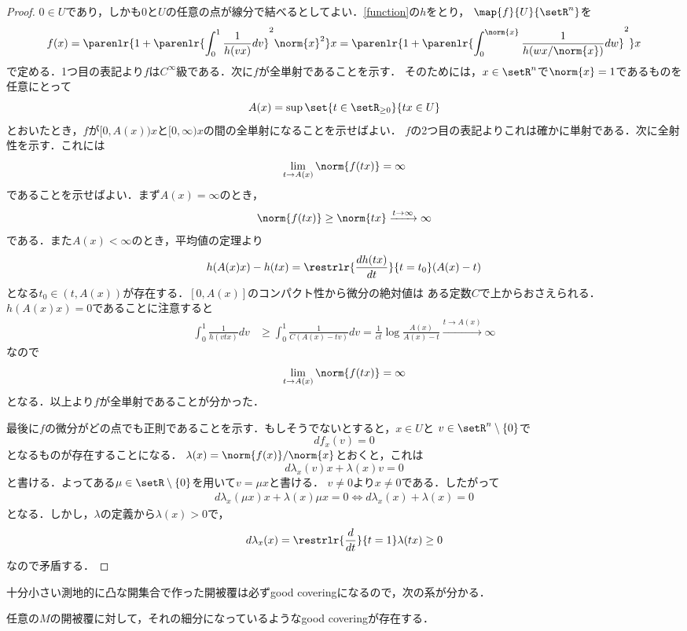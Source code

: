 \documentclass[uplatex]{jsarticle}
\begin{document}
\begin{proof}
  $0\in U$であり，しかも0と$U$の任意の点が線分で結べるとしてよい．\cref{function}の$h$をとり，
  $\map{f}{U}{\setR^n}$を
    \[f(x)=\parenlr{1+\parenlr{\int_0^1 \frac{1}{h(vx)}dv}^2\norm{x}^2}x
    =\parenlr{1+\parenlr{\int_0^{\norm{x}}\frac{1}{h(wx/\norm{x})}dw }^2 }x \]
  で定める．1つ目の表記より$f$は$C^\infty$級である．次に$f$が全単射であることを示す．
  そのためには，$x\in \setR^n$で$\norm{x}=1$であるものを任意にとって
    \[A(x)=\sup\set{t\in \setR_{\geq0}}{tx\in U}\]
  とおいたとき，$f$が$[0, A(x))x$と$[0,\infty)x$の間の全単射になることを示せばよい．
  $f$の2つ目の表記よりこれは確かに単射である．次に全射性を示す．これには
    \[\lim_{t\to A(x)} \norm{f(tx)} = \infty \]
  であることを示せばよい．まず$A(x)=\infty$のとき，
    \[\norm{f(tx)} \geq \norm{tx} \xrightarrow{t\to \infty} \infty \]
  である．また$A(x)< \infty$のとき，平均値の定理より
    \[h(A(x)x)-h(tx)=\restrlr{\frac{dh(tx)}{dt}}{t=t_0} (A(x)-t) \]
  となる$t_0\in (t, A(x))$が存在する．$[0,A(x)]$のコンパクト性から微分の絶対値は
  ある定数$C$で上からおさえられる．$h(A(x)x)=0$であることに注意すると
  \begin{align*}
    \int_0^1 \frac{1}{h(vtx)}dv&\geq \int_0^1 \frac{1}{C(A(x)-tv)}dv
    =\frac{1}{ct}\log\frac{A(x)}{A(x)-t}\xrightarrow{t\to A(x)} \infty
  \end{align*}
  なので
    \[\lim_{t\to A(x)} \norm{f(tx)}=\infty \]
  となる．以上より$f$が全単射であることが分かった．

  最後に$f$の微分がどの点でも正則であることを示す．もしそうでないとすると，$x\in U$と
  $v\in \setR^n\setminus\{0\}$で
    \[df_x(v) = 0\]
  となるものが存在することになる．
  $\lambda(x) = \norm{f(x)}/\norm{x}$とおくと，これは
    \[d\lambda_x(v)x+\lambda(x)v = 0 \]
  と書ける．よってある$\mu \in \setR\setminus\{0\}$を用いて$v = \mu x$と書ける．
  $v\neq 0$より$x\neq 0$である．したがって
  \begin{align*}
    d\lambda_x(\mu x)x+\lambda(x)\mu x=0 \iff d\lambda_x(x)+\lambda(x)=0
  \end{align*}
  となる．しかし，$\lambda$の定義から$\lambda(x)>0$で，
    \[d\lambda_x(x)=\restrlr{\frac{d}{dt}}{t=1}\lambda(tx)\geq 0\]
  なので矛盾する．
\end{proof}

十分小さい測地的に凸な開集合で作った開被覆は必ずgood coveringになるので，次の系が分かる．

\begin{corollary}
  任意の$M$の開被覆に対して，それの細分になっているようなgood coveringが存在する．
\end{corollary}
\end{document}
